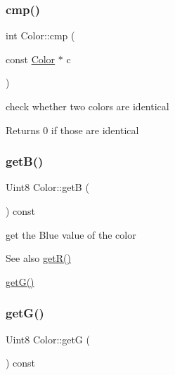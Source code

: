 \subsubsection{\texorpdfstring{cmp()}{cmp()}}
{\footnotesize\ttfamily int Color\+::cmp (\begin{DoxyParamCaption}\item[{const \mbox{\hyperlink{class_color}{Color}} $\ast$}]{c }\end{DoxyParamCaption})\hspace{0.3cm}{\ttfamily [inline]}}



check whether two colors are identical 

\begin{DoxyReturn}{Returns}
0 if those are identical 
\end{DoxyReturn}
\mbox{\label{class_color_a3121cb39d8669ea8cddbcfbbcc735e3f}} 
\subsubsection{\texorpdfstring{get\+B()}{getB()}}
{\footnotesize\ttfamily Uint8 Color\+::getB (\begin{DoxyParamCaption}{ }\end{DoxyParamCaption}) const\hspace{0.3cm}{\ttfamily [inline]}}



get the Blue value of the color 

\begin{DoxySeeAlso}{See also}
\mbox{\hyperlink{class_color_aecb6487557d6eb8386d1a11c37b026fb}{get\+R()}} 

\mbox{\hyperlink{class_color_a50f526c1152871f13d2285f1d52e72db}{get\+G()}} 
\end{DoxySeeAlso}
\mbox{\label{class_color_a50f526c1152871f13d2285f1d52e72db}} 
\subsubsection{\texorpdfstring{get\+G()}{getG()}}
{\footnotesize\ttfamily Uint8 Color\+::getG (\begin{DoxyParamCaption}{ }\end{DoxyParamCaption}) const\hspace{0.3cm}{\ttfamily [inline]}}



